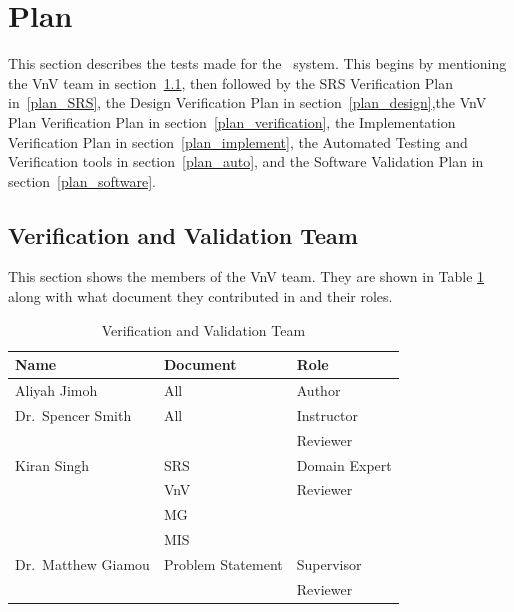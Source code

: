 \documentclass[12pt, titlepage]{article}
\begin{document}
\section{Plan}\label{sec_plan}

This section describes the tests made for the \progname~system. This begins by mentioning the VnV team in section~\ref{vnv_team}, then followed by the SRS Verification Plan in~\ref{plan_SRS}, the Design Verification Plan in section~\ref{plan_design},the VnV Plan Verification Plan in section~\ref{plan_verification}, the Implementation Verification Plan in section~\ref{plan_implement}, the Automated Testing and Verification tools in section~\ref{plan_auto}, and the Software Validation Plan in section~\ref{plan_software}.

\subsection{Verification and Validation Team}\label{vnv_team}

This section shows the members of the VnV team. They are shown in Table \ref{table:vnvTeam} along with what document they contributed in and their roles.

\begin{center}
  \begin{table}[h]
    \centering
    
    \begin{tabular}{|l|l|p{5cm}|}
        \hline
        \textbf{Name} & \textbf{Document} & \textbf{Role} \\
        \hline
        Aliyah Jimoh & All & Author\\
        \hline
        Dr.~Spencer Smith & All & Instructor \\
                          &     & Reviewer\\
        \hline
        Kiran Singh & SRS & Domain Expert\\
                    & VnV & Reviewer      \\
                    & MG &       \\
                    & MIS &       \\
        \hline
        Dr.~Matthew Giamou & Problem Statement & Supervisor \\
                           &                   & Reviewer \\
        \hline
    \end{tabular}

    \caption{Verification and Validation Team}
    \label{table:vnvTeam}
\end{table}
\end{center}
\end{document}
